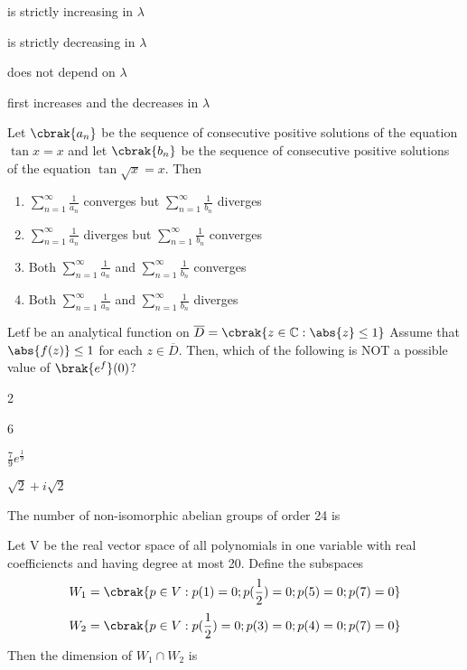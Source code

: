 		\begin{enumerate}
		\end{enumerate}
	\item Let $\cbrak{a_n}$ be the sequence of consecutive positive solutions of the equation $\tan{x} = x$ and let $\cbrak{b_n}$ be the sequence of consecutive positive solutions of the equation $\tan{\sqrt{x}} = x$. Then
		\begin{enumerate}
				\item $\sum_{n=1}^{\infty} \frac{1}{a_n}$ converges but $\sum_{n=1}^{\infty} \frac{1}{b_n}$ diverges
				\item $\sum_{n=1}^{\infty} \frac{1}{a_n}$ diverges but $\sum_{n=1}^{\infty} \frac{1}{b_n}$ converges
				\item Both $\sum_{n=1}^{\infty} \frac{1}{a_n}$ and $\sum_{n=1}^{\infty} \frac{1}{b_n}$ converges
				\item Both  $\sum_{n=1}^{\infty} \frac{1}{a_n}$ and $\sum_{n=1}^{\infty} \frac{1}{b_n}$ diverges
		\end{enumerate}
	\item Letf be an analytical function on $\overline{D} = \cbrak{z \in \mathbb{C} : \abs{z} \leq 1}$ Assume that $\abs{f(z)} \leq 1$ for each $z \in \overline{D}$. Then, which of the following is NOT a possible value of $\brak{e^f} (0) $?
		\begin{enumerate}
				\begin{multicols}{4}
				\item 2
				\item 6
				\item $\frac{7}{9} e^{\frac{1}{9}}$
				\item $\sqrt{2} + i \sqrt{2}$
				\end{multicols}
		\end{enumerate}
	\item The number of non-isomorphic abelian groups of order 24 is
	\item Let V be the real vector space of all polynomials in one variable with real coefficiencts and having degree at most 20. Define the subspaces
		$$ W_1 = \cbrak{p \in V : p(1) = 0 ; p(\frac{1}{2}) = 0 ; p(5) = 0 ; p(7) = 0 } $$
		$$ W_2 = \cbrak{p \in V : p(\frac{1}{2}) = 0 ; p(3) = 0 ; p(4) = 0 ; p(7) = 0 } $$
		Then the dimension of $ W_1 \cap W_2 $ is

